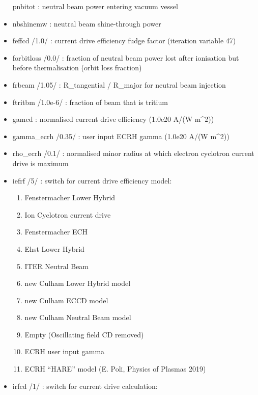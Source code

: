 \documentclass[]{article}
\begin{document}
\begin{itemize}
  pnbitot : neutral beam power entering vacuum vessel
\item
  nbshinemw : neutral beam shine-through power
\item
  feffcd /1.0/ : current drive efficiency fudge factor (iteration
  variable 47)
\item
  forbitloss /0.0/ : fraction of neutral beam power lost after
  ionisation but before thermalisation (orbit loss fraction)
\item
  frbeam /1.05/ : R\_tangential / R\_major for neutral beam injection
\item
  ftritbm /1.0e-6/ : fraction of beam that is tritium
\item
  gamcd : normalised current drive efficiency (1.0e20 A/(W m\^{}2))
\item
  gamma\_ecrh /0.35/ : user input ECRH gamma (1.0e20 A/(W m\^{}2))
\item
  rho\_ecrh /0.1/ : normalised minor radius at which electron cyclotron
  current drive is maximum
\item
  iefrf /5/ : switch for current drive efficiency model:

  \begin{enumerate}
  \itemsep1pt\parskip0pt
  \item
    Fenstermacher Lower Hybrid
  \item
    Ion Cyclotron current drive
  \item
    Fenstermacher ECH
  \item
    Ehst Lower Hybrid
  \item
    ITER Neutral Beam
  \item
    new Culham Lower Hybrid model
  \item
    new Culham ECCD model
  \item
    new Culham Neutral Beam model
  \item
    Empty (Oscillating field CD removed)
  \item
    ECRH user input gamma
  \item
    ECRH ``HARE'' model (E. Poli, Physics of Plasmas 2019)
  \end{enumerate}
\item
  irfcd /1/ : switch for current drive calculation:


\end{itemize}
\end{document}
